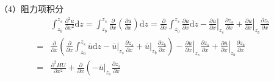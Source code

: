                                             （4）阻力项积分
                                            \begin{equation}
                                              \begin{aligned}
    &\int_{z_{b}}^{ z_{s}}\!
    \frac{\partial^{2} \overline{u}}{\partial x^{2}}
    \mathrm{d}z
    =
    \int_{z_{b}}^{ z_{s}}\!
    \frac{\partial}{\partial x}
    \left(\frac{\partial \overline{u}}{\partial x}\right)
    \mathrm{d}z
    =
    \frac{\partial}{\partial x}
    \int_{z_0}^{ z_{s}}\!
    \frac{\partial \overline{u}}{\partial x}
    \mathrm{d}z
    -
    \left.\frac{\partial \overline{u}}{\partial x}\right|_{z_{s}}\frac{\partial  z_{s}}{\partial x}
      +
      \left.\frac{\partial \overline{u}}{\partial x}\right|_{z_{b}}\frac{\partial z_{b}}{\partial x}
        \\
                                                =&
                                                \frac{\partial}{\partial x}
                                                \left(
                                                  \frac{\partial}{\partial x}
                                                  \int_{z_0}^{ z_{s}}\!
                                                  \overline{u}
                                                  \mathrm{d}z
                                                  -
                                                  \left.\overline{u}\right|_{z_{s}}\frac{\partial  z_{s}}{\partial x}
                                                    +
                                                    \left.\overline{u}\right|_{z_{b}}\frac{\partial z_{b}}{\partial x}
                                                    \right)
                                                    -
                                                    \left.\frac{\partial \overline{u}}{\partial x}\right|_{z_{s}}\frac{\partial  z_{s}}{\partial x}
                                                      +
                                                      \left.\frac{\partial \overline{u}}{\partial x}\right|_{z_{b}}\frac{\partial z_{b}}{\partial x}
                                                        \\
                                                =&
                                                \frac{\partial^{2} HU}{\partial x^{2}} +
                                                \frac{\partial}{\partial x}
                                                \left(
                                                  -
                                                  \left.\overline{u}\right|_{z_{s}}\frac{\partial  z_{s}}{\partial x}

\end{aligned}
\end{equation}
